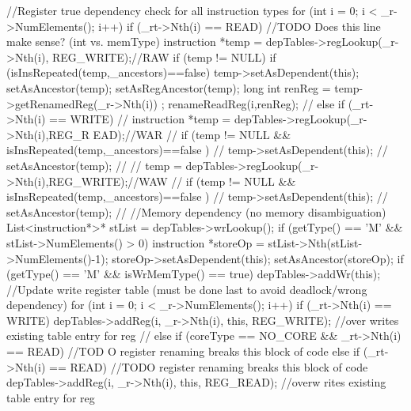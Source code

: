 \begin{DoxyCode}
                                                                  {
        //Register true dependency check for all instruction types
        for (int i = 0; i < _r->NumElements(); i++) {
                if (_rt->Nth(i) == READ) { //TODO Does this line make sense? (int
       vs. memType)
                        instruction *temp = depTables->regLookup(_r->Nth(i),
      REG_WRITE);//RAW
                        if (temp != NULL) {
                                if (isInsRepeated(temp,_ancestors)==false) {
                                        temp->setAsDependent(this);
                                        setAsAncestor(temp);
                                        setAsRegAncestor(temp);
                                }
                                long int renReg = temp->getRenamedReg(_r->Nth(i))
      ;
                                renameReadReg(i,renReg);
                        }
                // } else if (_rt->Nth(i) == WRITE) {
                //      instruction *temp = depTables->regLookup(_r->Nth(i),REG_R
      EAD);//WAR
                //      if (temp != NULL && isInsRepeated(temp,_ancestors)==false
      ) {
                //              temp->setAsDependent(this);
                //              setAsAncestor(temp);
                //      }
                //      temp = depTables->regLookup(_r->Nth(i),REG_WRITE);//WAW
                //      if (temp != NULL && isInsRepeated(temp,_ancestors)==false
      ) {
                //              temp->setAsDependent(this);
                //              setAsAncestor(temp);
                //      }
                }
        }
        //Memory dependency (no memory disambiguation)
        List<instruction*>* stList = depTables->wrLookup();
        if (getType() == 'M' && stList->NumElements() > 0) {
                instruction *storeOp = stList->Nth(stList->NumElements()-1);
                storeOp->setAsDependent(this);
                setAsAncestor(storeOp);
        }
        if (getType() == 'M' && isWrMemType() == true) {
                depTables->addWr(this);
        }
        //Update write register table (must be done last to avoid deadlock/wrong 
      dependency)
        for (int i = 0; i < _r->NumElements(); i++) {
                if (_rt->Nth(i) == WRITE) {
                        depTables->addReg(i, _r->Nth(i), this, REG_WRITE); //over
      writes existing table entry for reg
                // } else if (coreType == NO_CORE && _rt->Nth(i) == READ) { //TOD
      O register renaming breaks this block of code
                } else if (_rt->Nth(i) == READ) { //TODO register renaming breaks
       this block of code
                        depTables->addReg(i, _r->Nth(i), this, REG_READ); //overw
      rites existing table entry for reg
                }
        }
}
\end{DoxyCode}
